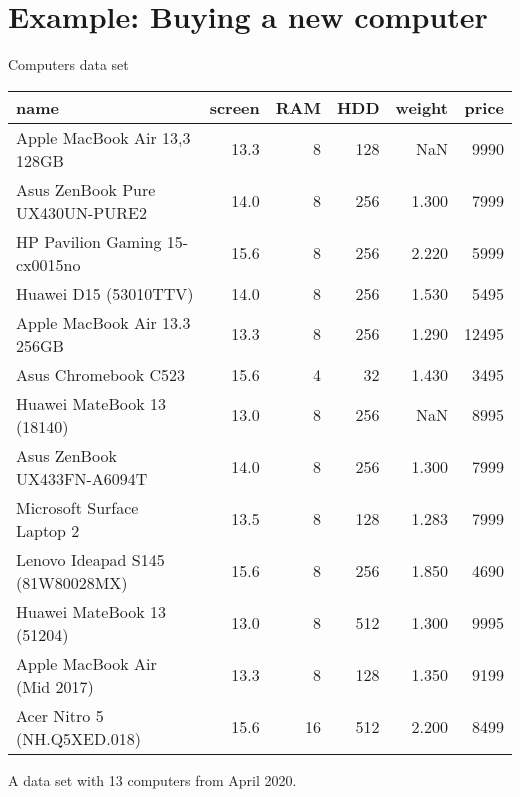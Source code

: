 \documentclass[11pt, aspectratio=149]{beamer}
\theoremstyle{plain}
\begin{document}
\section{Example: Buying a new computer}

\begin{frame}[fragile, t]{Computers data set}
	\footnotesize 
\begin{tabular}{lrrrrr}
	\toprule
	name &  screen &  RAM &  HDD &  weight &  price \\
	\midrule
	Apple MacBook Air 13,3 128GB &    13.3 &    8 &  128 &     NaN &   9990 \\
	Asus ZenBook Pure UX430UN-PURE2 &    14.0 &    8 &  256 &   1.300 &   7999 \\
	HP Pavilion Gaming 15-cx0015no &    15.6 &    8 &  256 &   2.220 &   5999 \\
	Huawei D15 (53010TTV) &    14.0 &    8 &  256 &   1.530 &   5495 \\
	Apple MacBook Air 13.3 256GB &    13.3 &    8 &  256 &   1.290 &  12495 \\
	Asus Chromebook C523 &    15.6 &    4 &   32 &   1.430 &   3495 \\
	Huawei MateBook 13 (18140) &    13.0 &    8 &  256 &     NaN &   8995 \\
	Asus ZenBook UX433FN-A6094T &    14.0 &    8 &  256 &   1.300 &   7999 \\
	Microsoft Surface Laptop 2 &    13.5 &    8 &  128 &   1.283 &   7999 \\
	Lenovo Ideapad S145 (81W80028MX) &    15.6 &    8 &  256 &   1.850 &   4690 \\
	Huawei MateBook 13 (51204) &    13.0 &    8 &  512 &   1.300 &   9995 \\
	Apple MacBook Air (Mid 2017) &    13.3 &    8 &  128 &   1.350 &   9199 \\
	Acer Nitro 5 (NH.Q5XED.018) &    15.6 &   16 &  512 &   2.200 &   8499 \\
	\bottomrule
\end{tabular}
\normalsize

\vspace*{1em}
A data set with 13 computers from April 2020.
\end{frame}
\end{document}
